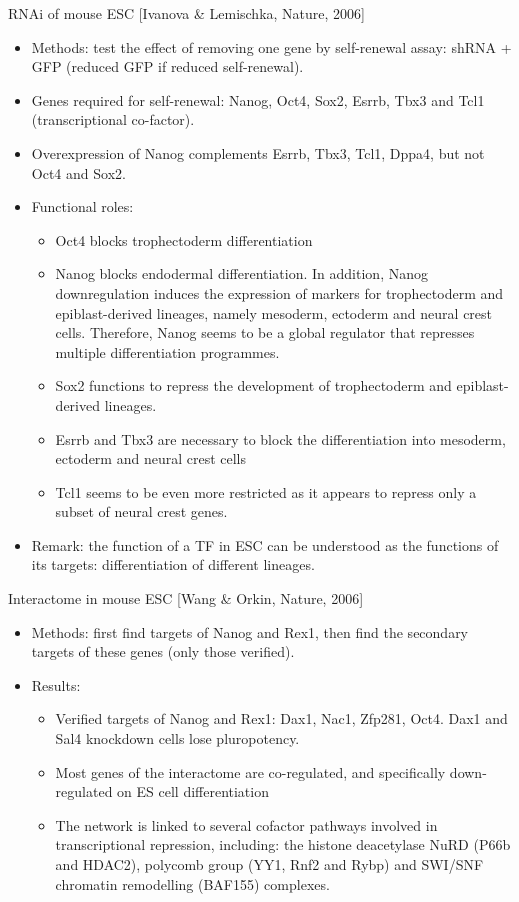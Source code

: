 \documentclass{report}
\begin{document}
RNAi of mouse ESC [Ivanova \& Lemischka, Nature, 2006]
\begin{itemize}
	\item Methods: test the effect of removing one gene by self-renewal assay: shRNA + GFP (reduced GFP if reduced self-renewal). 

		\item Genes required for self-renewal: Nanog, Oct4, Sox2, Esrrb, Tbx3 and Tcl1 (transcriptional co-factor). 
		\item Overexpression of Nanog complements Esrrb, Tbx3, Tcl1, Dppa4, but not Oct4 and Sox2. 
		\item Functional roles: 
		\begin{itemize}
			\item Oct4 blocks trophectoderm differentiation
			\item Nanog blocks endodermal differentiation. In addition, Nanog downregulation induces the expression of markers for trophectoderm and epiblast-derived lineages, namely mesoderm, ectoderm and neural crest cells. Therefore, Nanog seems to be a global regulator that
			represses multiple differentiation programmes.
			\item Sox2 functions to repress the development of trophectoderm and epiblast-derived lineages. 
			\item Esrrb and Tbx3 are necessary to block the differentiation into mesoderm, ectoderm and neural crest cells
			\item Tcl1 seems to be even more restricted as it appears to repress only a subset of neural crest genes. 
		\end{itemize}
	
	\item Remark: the function of a TF in ESC can be understood as the functions of its targets: differentiation of different lineages. 
\end{itemize}
	
Interactome in mouse ESC [Wang \& Orkin, Nature, 2006]
\begin{itemize}
	\item Methods: first find targets of Nanog and Rex1, then find the secondary targets of these genes (only those verified). 
	
	\item Results: 
	\begin{itemize}
		\item Verified targets of Nanog and Rex1: Dax1, Nac1, Zfp281, Oct4. Dax1 and Sal4 knockdown cells lose pluropotency. 
		\item Most genes of the interactome are co-regulated, and specifically down-regulated on ES cell differentiation
		\item The network is linked to several cofactor pathways involved in transcriptional repression, including: the histone deacetylase NuRD (P66b and HDAC2), polycomb group (YY1, Rnf2 and Rybp) and SWI/SNF chromatin remodelling (BAF155) complexes.
	\end{itemize}
\end{itemize}
	
\end{document}
